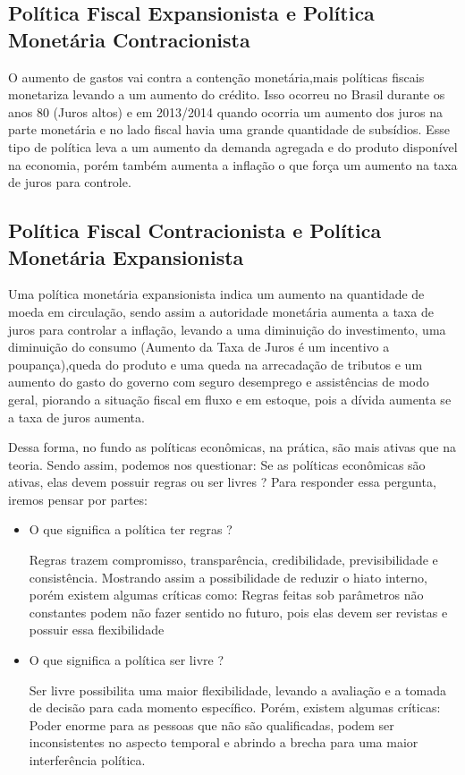 \subsection*{Política Fiscal Expansionista e Política Monetária Contracionista}
    O aumento de gastos vai contra a contenção monetária,mais políticas fiscais monetariza levando a um aumento do crédito. Isso ocorreu no Brasil durante os anos 80 (Juros altos) e em 2013/2014 quando ocorria um aumento dos juros na parte monetária e no lado fiscal havia uma grande quantidade de subsídios. Esse tipo de política leva a um aumento da demanda agregada e do produto disponível na economia, porém também aumenta a inflação o que força um aumento na taxa de juros para controle. 
\subsection*{Política Fiscal Contracionista e Política Monetária Expansionista}
Uma política monetária expansionista indica um aumento na quantidade de moeda em circulação, sendo assim a autoridade monetária aumenta a taxa de juros para controlar a inflação, levando a uma diminuição do investimento, uma diminuição do consumo (Aumento da Taxa de Juros é um incentivo a poupança),queda do produto e uma queda na arrecadação de tributos e um aumento do gasto do governo com seguro desemprego e assistências de modo geral, piorando a situação fiscal em fluxo e em estoque, pois a dívida aumenta se a taxa de juros aumenta. 

Dessa forma, no fundo as políticas econômicas, na prática, são mais ativas que na teoria. Sendo assim, podemos nos questionar: Se as políticas econômicas são ativas, elas devem possuir regras ou ser livres ? Para responder essa pergunta, iremos pensar por partes: 
\begin{itemize}
    \item O que significa a política ter regras ? 
    
    Regras trazem compromisso, transparência, credibilidade, previsibilidade e consistência. Mostrando assim a possibilidade de reduzir o hiato interno, porém existem algumas críticas como: Regras feitas sob parâmetros não constantes podem não fazer sentido no futuro, pois elas devem ser revistas e possuir essa flexibilidade
    \item O que significa a política ser livre ? 
    
    Ser livre possibilita uma maior flexibilidade, levando a avaliação e a tomada de decisão para cada momento específico. Porém, existem algumas críticas: Poder enorme para as pessoas que não são qualificadas, podem ser inconsistentes no aspecto temporal e abrindo a brecha para uma maior interferência política. 
\end{itemize}

